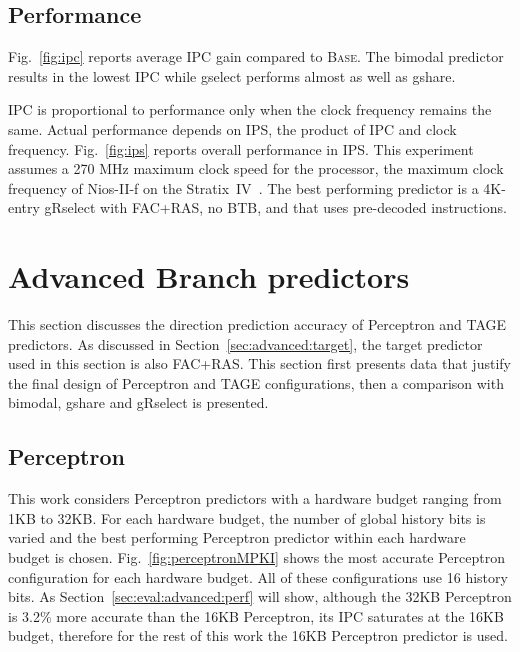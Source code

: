 \subsection{Performance}
\label{sec:eval:performance}
Fig.~\ref{fig:ipc} reports  average IPC gain compared to \textsc{Base}. The bimodal predictor results in the lowest IPC  while gselect performs almost as well as gshare.

IPC is proportional to performance only when the clock frequency remains the same. Actual performance depends  on IPS, the product of IPC and clock frequency. Fig.~\ref{fig:ips} reports overall performance in IPS. This experiment assumes a 270 MHz maximum clock speed for the processor, the maximum clock frequency of Nios-II-f on the Stratix~IV~\cite{niosfmax}. The best performing predictor is a 4K-entry gRselect with FAC+RAS, no BTB, and that uses pre-decoded instructions.



\section{Advanced Branch predictors}
\label{sec:eval:advanced}
This section discusses the direction prediction accuracy of Perceptron and TAGE predictors. As discussed in Section~\ref{sec:advanced:target}, the target predictor used in this section is also FAC+RAS. This section first presents data that justify the final design of Perceptron and TAGE configurations, then a comparison with bimodal, gshare and gRselect is presented.

\subsection{Perceptron}
\label{sec:eval:advanced:perceptron}
This work considers Perceptron predictors with a hardware budget ranging from 1KB to 32KB. For each hardware budget, the number of global history bits is varied and the best performing Perceptron predictor within each hardware budget is chosen. Fig.~\ref{fig:perceptronMPKI} shows the most accurate Perceptron configuration for each hardware budget. All of these configurations use 16 history bits. As Section~\ref{sec:eval:advanced:perf} will show, although the 32KB Perceptron is 3.2\% more accurate than the 16KB Perceptron, its IPC saturates at the 16KB budget, therefore for the rest of this work the 16KB Perceptron predictor is used.

